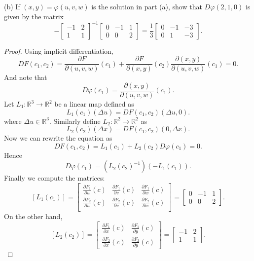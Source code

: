 \begin{itemize}
(b) If $(x, y)=\varphi(u, v, w)$ is the solution in part (a), show that $D \varphi(2,1,0)$ is given by the matrix
\[
-\left[\begin{array}{rr}
-1 & 2 \\
1 & 1
\end{array}\right]^{-1}\left[\begin{array}{rrr}
0 & -1 & 1 \\
0 & 0 & 2
\end{array}\right]=\frac{1}{3}\left[\begin{array}{rrr}
0 & -1 & -3 \\
0 & 1 & -3
\end{array}\right] .
\]
\begin{proof}
	Using implicit differentiation,
	\[
		DF(c_1, c_2) = \frac{\partial F}{\partial (u,v,w)}(c_1) + \frac{\partial F}{\partial (x,y)}(c_2) \frac{\partial (x,y)}{\partial (u,v,w)}(c_1) = 0
	.\] 
	And note that
	\[
		D \varphi (c_1) = \frac{\partial (x,y)}{\partial (u,v,w)}(c_1)
	.\] 
	Let $L_1: \mathbb{R}^3 \to \mathbb{R}^2$ be a linear map defined as
	\[
		L_1(c_1)(\Delta u)=D F(c_1,c_2)(\Delta u, 0)
	.\] 
	where $\Delta u \in \mathbb{R}^3$. Similarly define $L_2 : \mathbb{R}^2 \to \mathbb{R}^2$ as
	\[
		L_2(c_2)(\Delta x) = DF(c_1,c_2)(0,\Delta x)
	.\] 
	Now we can rewrite the equation as
	\[
		DF(c_1,c_2) = L_1(c_1) + L_2(c_2) D\varphi(c_1) = 0
	.\] 
	Hence
	\[
		D\varphi(c_1) = \left( L_2(c_2)^{-1} \right) \left( - L_1(c_1) \right) 
	.\] 
	Finally we compute the matrices:
	\[
		\left[ L_1(c_1) \right] = 
\left[\begin{array}{rrr}
\frac{\partial F_1}{\partial u}(c) & \frac{\partial F_1}{\partial v}(c) & \frac{\partial F_1}{\partial w}(c) \\
\frac{\partial F_2}{\partial u}(c) & \frac{\partial F_2}{\partial v}(c) & \frac{\partial F_2}{\partial w}(c) 
\\\end{array}\right]
= \left[\begin{array}{rrr}
0 & -1 & 1 \\
0 & 0 & 2
\end{array}\right]
	.\] 
On the other hand,
\[
		\left[ L_2(c_2) \right] = 
\left[\begin{array}{rr}
\frac{\partial F_1}{\partial x}(c) & \frac{\partial F_1}{\partial y}(c) \\
\frac{\partial F_2}{\partial x}(c) & \frac{\partial F_2}{\partial y}(c)
\end{array}\right]
= \left[\begin{array}{rr}
-1 & 2 \\
1 & 1 
\end{array}\right]
	.\]
\end{proof}


\end{itemize}

